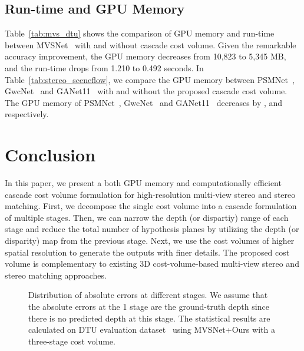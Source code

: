 \documentclass[10pt,twocolumn,letterpaper]{article}
\begin{document}
\subsection{Run-time and GPU Memory} 
Table~\ref{tab:mvs_dtu} shows the comparison of GPU memory and run-time between MVSNet~\cite{yao2018mvsnet} with and without cascade cost volume.
Given the remarkable accuracy improvement, the GPU memory decreases from 10,823 to 5,345 MB, and the run-time drops from 1.210 to 0.492 seconds.
In Table~\ref{tab:stereo_sceneflow}, we compare the GPU memory between PSMNet~\cite{chang2018pyramid}, GwcNet~\cite{guo2019group} and GANet11~\cite{zhang2019ga} with and without the proposed cascade cost volume.
The GPU memory of PSMNet~\cite{chang2018pyramid}, GwcNet~\cite{guo2019group} and GANet11~\cite{zhang2019ga} decreases by ,  and  respectively.













 
\section{Conclusion} 
In this paper, we present a both GPU memory and computationally efficient cascade cost volume formulation for high-resolution multi-view stereo and stereo matching.
First, we decompose the single cost volume into a cascade formulation of multiple stages.
Then, we can narrow the depth (or dispartiy) range of each stage and reduce the total number of hypothesis planes by utilizing the depth (or disparity) map from the previous stage.
Next, we use the cost volumes of higher spatial resolution to generate the outputs with finer details.
The proposed cost volume is complementary to existing 3D cost-volume-based multi-view stereo and stereo matching approaches. 



 


{\small


}

\clearpage 
\begin{figure*}[ht!]
\begin{center}
\end{center}
\vspace{-4mm}
\caption{Distribution of absolute errors at different stages.
We assume that the absolute errors at the 1 stage are the ground-truth depth since there is no predicted depth at this stage.
The statistical results are calculated on DTU evaluation dataset~\cite{aanaes2016dtu} using MVSNet+Ours with a three-stage cost volume.}
\label{fig:search space}
\end{figure*}
\end{document}
